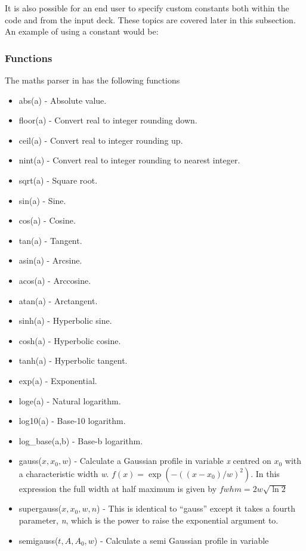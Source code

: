 It is also possible for an end user to specify custom constants both within
the code and from the input deck. These topics are covered later in this
subsection. An example of using a constant would be:\\
\indent{}

\subsubsection{Functions}
\label{sec:functions}
The maths parser in {\EPOCH} has the following functions
\begin{itemize}
\item abs(a) - Absolute value.
\item floor(a) - Convert real to integer rounding down.
\item ceil(a) - Convert real to integer rounding up.
\item nint(a) - Convert real to integer rounding to nearest integer.
\item sqrt(a) - Square root.
\item sin(a) - Sine.
\item cos(a) - Cosine.
\item tan(a) - Tangent.
\item asin(a) - Arcsine.
\item acos(a) - Arccosine.
\item atan(a) - Arctangent.
\item sinh(a) - Hyperbolic sine.
\item cosh(a) - Hyperbolic cosine.
\item tanh(a) - Hyperbolic tangent.
\item exp(a) - Exponential.
\item loge(a) - Natural logarithm.
\item log10(a) - Base-10 logarithm.
\item log\_base(a,b) - Base-b logarithm.
\item gauss($x,x_0,w$) - Calculate a Gaussian profile in variable
    {\it x} centred on {\it $x_0$} with a characteristic width {\it w}.
    $f(x) = \exp{(-((x-x_0)/w)^2)}$. In this expression the
    full width at half maximum is given by $fwhm = 2 w \sqrt{\ln{2}}$
\item supergauss($x,x_0,w,n$) - This is identical to ``gauss'' except it
    takes a fourth parameter, {\it n}, which is the power to raise the
    exponential argument to.
\item semigauss($t,A,A_0,w$) - Calculate a semi Gaussian profile in variable

\end{itemize}
